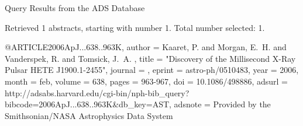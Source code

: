 Query Results from the ADS Database


Retrieved 1 abstracts, starting with number 1.  Total number selected: 1.

@ARTICLE{2006ApJ...638..963K,
   author = {{Kaaret}, P. and {Morgan}, E.~H. and {Vanderspek}, R. and {Tomsick}, J.~A.
	},
    title = "{Discovery of the Millisecond X-Ray Pulsar HETE J1900.1-2455}",
  journal = {\apj},
   eprint = {astro-ph/0510483},
     year = 2006,
    month = feb,
   volume = 638,
    pages = {963-967},
      doi = {10.1086/498886},
   adsurl = {http://adsabs.harvard.edu/cgi-bin/nph-bib_query?bibcode=2006ApJ...638..963K&db_key=AST},
  adsnote = {Provided by the Smithsonian/NASA Astrophysics Data System}
}


